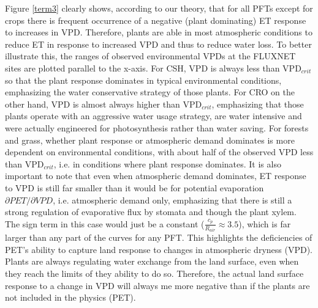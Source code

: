 \documentclass[draft,linenumbers]{agujournal}
\begin{document}
Figure \ref{term3} clearly shows, according to our theory, that for all PFTs except for crops there is frequent occurrence of a negative (plant dominating) ET response to increases in VPD. Therefore, plants are able in most atmospheric conditions to reduce ET in response to increased VPD and thus to reduce water loss. To better illustrate this, the ranges of observed environmental VPDs at the FLUXNET sites are plotted parallel to the x-axis. For CSH, VPD is always less than VPD$_{crit}$ so that the plant response dominates in typical environmental conditions, emphasizing the water conservative strategy of those plants. For CRO on the other hand, VPD is almost always higher than VPD$_{crit}$, emphasizing that those plants operate with an aggressive water usage strategy, are water intensive and were actually engineered for photosynthesis rather than water saving. For forests and grass, whether plant response or atmospheric demand dominates is more dependent on environmental conditions, with about half of the observed VPD less than VPD$_{crit}$, i.e. in conditions where plant response dominates. It is also important to note that even when atmospheric demand dominates, ET response to VPD is still far smaller than it would be for potential evaporation $\partial PET/\partial VPD$, i.e. atmospheric demand only, emphasizing that there is still a strong regulation of evaporative flux by stomata and though the plant xylem. The sign term in this case would just be a constant ($\frac{c_p}{R_{air}} \approx 3.5$), which is far larger than any part of the curves for any PFT. This highlights the deficiencies of PET's ability to capture land response to changes in atmospheric dryness (VPD). Plants are always regulating water exchange from the land surface, even when they reach the limits of they ability to do so. Therefore, the actual land surface response to a change in VPD will always me more negative than if the plants are not included in the physics (PET). 
\end{document}
